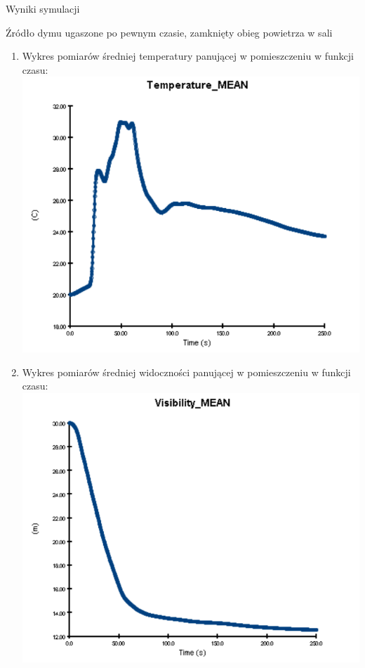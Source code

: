 \documentclass[a4paper, 12pt]{scrartcl}
\begin{document}
\begin{section}{Wyniki symulacji}
		\begin{subsection}{Źródło dymu ugaszone po pewnym czasie, zamknięty obieg powietrza w sali}
			\begin{enumerate}[i]
				\item Wykres pomiarów średniej temperatury panującej w pomieszczeniu w funkcji czasu: \\
				\includegraphics{../H24_Finite_Smoke/temp} \newpage
				\item Wykres pomiarów średniej widoczności panującej w pomieszczeniu w funkcji czasu:
				\includegraphics{../H24_Finite_Smoke/visibility}
			\end{enumerate}
		\end{subsection}
	

\end{section}
\end{document}
